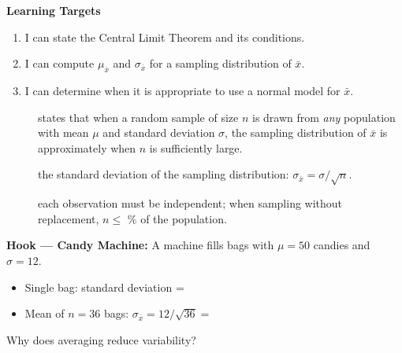 \documentclass[10pt]{article}
\begin{document}
\namedateperiod

\vspace{0.1in}

\begin{objectivebox}
\textbf{Learning Targets}
\begin{enumerate}
  \item I can state the Central Limit Theorem and its conditions.
  \item I can compute $\mu_{\bar{x}}$ and $\sigma_{\bar{x}}$ for a sampling distribution of $\bar{x}$.
  \item I can determine when it is appropriate to use a normal model for $\bar{x}$.
\end{enumerate}
\end{objectivebox}

\begin{vocabbox}
\begin{description}
  \item[] states that when a random sample of size $n$ is drawn from \emph{any} population with mean $\mu$ and standard deviation $\sigma$, the sampling distribution of $\bar{x}$ is approximately  when $n$ is sufficiently large.
  \item[] the standard deviation of the sampling distribution: $\sigma_{\bar{x}} = \sigma/\sqrt{n}$.
  \item[] each observation must be independent; when sampling without replacement, $n \le$ \% of the population.
\end{description}
\end{vocabbox}

\begin{hookbox}
\textbf{Hook — Candy Machine:} A machine fills bags with $\mu = 50$ candies and $\sigma = 12$.
\begin{itemize}
  \item Single bag: standard deviation = 
  \item Mean of $n = 36$ bags: $\sigma_{\bar{x}} = 12/\sqrt{36} = $ 
\end{itemize}
Why does averaging reduce variability?
\\
\end{hookbox}
\end{document}

